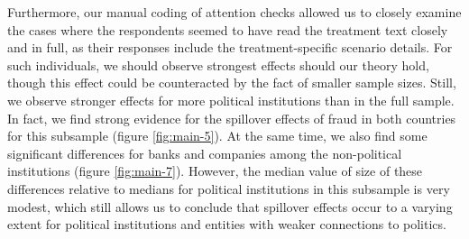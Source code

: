 \documentclass[11pt, ngerman,english,a4]{article}
\begin{document}
Furthermore, our manual coding of attention checks allowed us to closely examine the cases where the respondents seemed to have read the treatment text closely and in full, as their responses include the treatment-specific scenario details. For such individuals, we should observe strongest effects should our theory hold, though this effect could be counteracted by the fact of smaller sample sizes. Still, we observe stronger effects for more political institutions than in the full sample. In fact, we find strong evidence for the spillover effects of fraud in both countries for this subsample (figure \ref{fig:main-5}). At the same time, we also find some significant differences for banks and companies among the non-political institutions (figure \ref{fig:main-7}). However, the median value of size of these differences relative to medians for political institutions in this subsample is very modest, which still allows us to conclude that spillover effects occur to a varying extent for political institutions and entities with weaker connections to politics. 
\end{document}
